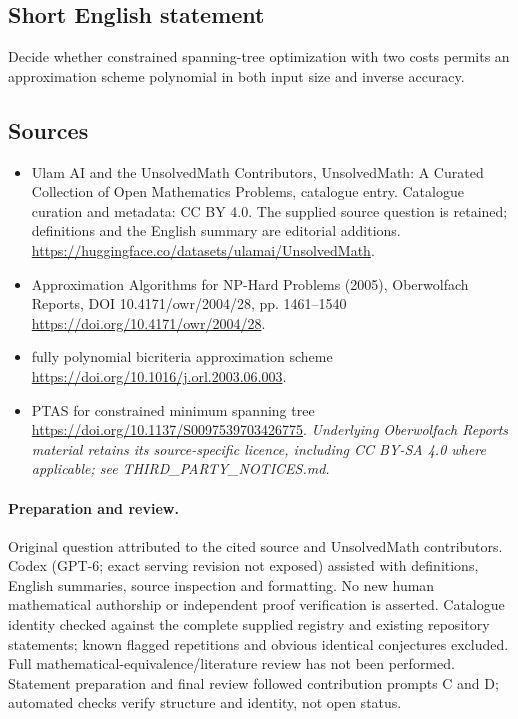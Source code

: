 \documentclass[11pt]{article}
\begin{document}
\subsection{Short English statement}
Decide whether constrained spanning-tree optimization with two costs permits an approximation scheme polynomial in both input size and inverse accuracy.
\subsection{Sources}
\begin{itemize}
\item[\hypertarget{source:statement:1}{S1}] Ulam AI and the UnsolvedMath Contributors, UnsolvedMath: A Curated Collection of Open Mathematics Problems, catalogue entry. Catalogue curation and metadata: CC BY 4.0. The supplied source question is retained; definitions and the English summary are editorial additions.
\url{https://huggingface.co/datasets/ulamai/UnsolvedMath}.
\item[\hypertarget{source:statement:2}{S2}] Approximation Algorithms for NP-Hard Problems (2005), Oberwolfach Reports, DOI 10.4171/owr/2004/28, pp. 1461--1540
\url{https://doi.org/10.4171/owr/2004/28}.
\item[\hypertarget{source:statement:3}{S3}] fully polynomial bicriteria approximation scheme
\url{https://doi.org/10.1016/j.orl.2003.06.003}.
\item[\hypertarget{source:statement:4}{S4}] PTAS for constrained minimum spanning tree
\url{https://doi.org/10.1137/S0097539703426775}.
\textit{Underlying Oberwolfach Reports material retains its source-specific licence, including CC BY-SA 4.0 where applicable; see THIRD\_PARTY\_NOTICES.md.}
\end{itemize}
\paragraph{Preparation and review.}
Original question attributed to the cited source and UnsolvedMath contributors. Codex (GPT-6; exact serving revision not exposed) assisted with definitions, English summaries, source inspection and formatting. No new human mathematical authorship or independent proof verification is asserted. Catalogue identity checked against the complete supplied registry and existing repository statements; known flagged repetitions and obvious identical conjectures excluded. Full mathematical-equivalence/literature review has not been performed. Statement preparation and final review followed contribution prompts C and D; automated checks verify structure and identity, not open status.
\label{end:statement}
\end{document}
